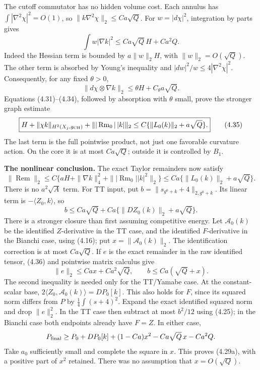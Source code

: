 \documentclass[
  10pt,
]{article}
\begin{document}
The cutoff commutator has no hidden volume cost. Each annulus has
\(\int|\nabla^2\chi|^2=O(1)\), so \(\|k\nabla^2\chi\|_2\le Ca\sqrt Q\).
For \(w=|d\chi|^2\), integration by parts gives \[
 \int w|\nabla k|^2
 \le Ca\sqrt Q\,H+Ca^2Q. \tag{4.34}
\] Indeed the Hessian term is bounded by \(a\|w\|_2H\), with
\(\|w\|_2=O(\sqrt Q)\). The other term is absorbed by Young's inequality
and \(|dw|^2/w\le4|\nabla^2\chi|^2\). Consequently, for any fixed
\(\theta>0\), \[
 \|d\chi\otimes\nabla k\|_2
                 \le\theta H+C_\theta a\sqrt Q.
\] Equations (4.31)--(4.34), followed by absorption with \(\theta\)
small, prove the stronger graph estimate \[
 \boxed{H+\|\chi k\|_{H^2(X_j,g_{\rm CH})}
                 +\||\operatorname{Rm}_0|\,|k|\|_2
       \le C\{\|L_0(k)\|_2+a\sqrt Q\}.} \tag{4.35}
\] The last term is the full pointwise product, not just one favorable
curvature action. On the core it is at most \(Ca\sqrt Q\); outside it is
controlled by \(B_1\).

\textbf{The nonlinear conclusion.} The exact Taylor remainders now
satisfy \[
 \|\operatorname{Rem}\|_2
 \le C\{aH+\|\nabla k\|_4^2+
                       \||\operatorname{Rm}_0||k|^2\|_2\}
 \le Ca\{\|L_0(k)\|_2+a\sqrt Q\}. \tag{4.36}
\] There is no \(a^2\sqrt A\) term. For TT input, put
\(b=\|s_{g^0+k}+4\|_{2,g^0+k}\). Its linear term is
\(-\langle Z_0,k\rangle\), so \[
 b\le Ca\sqrt Q+
                  Ca\{\|DZ_0(k)\|_2+a\sqrt Q\}.
\] There is a stronger closure than first assuming competitive energy.
Let \(\mathcal A_0(k)\) be the identified \(Z\)-derivative in the TT
case, and the identified \(F\)-derivative in the Bianchi case, using
(4.16); put \(x=\|\mathcal A_0(k)\|_2\). The identification correction
is at most \(Ca\sqrt Q\). If \(e\) is the exact remainder in the raw
identified tensor, (4.36) and pointwise matrix calculus give \[
 \|e\|_2\le Ca x+Ca^2\sqrt Q,\qquad
 b\le Ca(\sqrt Q+x). \tag{4.37}
\] The second inequality is needed only for the TT/Yamabe case. At the
constant-scalar base, \(2\langle Z_0,\mathcal A_0(k)\rangle=DP_0[k]\).
This also holds for \(F\), since its squared norm differs from \(P\) by
\(\frac14\int(s+4)^2\). Expand the exact identified squared norm and
drop \(\|e\|_2^2\). In the TT case then subtract at most \(b^2/12\)
using (4.25); in the Bianchi case both endpoints already have \(F=Z\).
In either case, \[
 P_{\rm final}
 \ge P_0+DP_0[k]+(1-Ca)x^2-Ca\sqrt Q\,x-Ca^2Q.
\] Take \(a_0\) sufficiently small and complete the square in \(x\).
This proves (4.29a), with a positive part of \(x^2\) retained. There was
no assumption that \(x=O(\sqrt Q)\).
\end{document}
